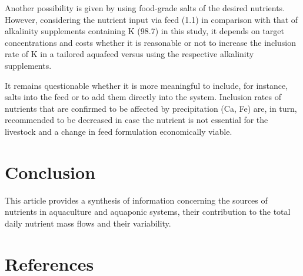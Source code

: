 \documentclass[preprint, 3p,
authoryear]{elsarticle} %
\begin{document}
Another possibility is given by using food-grade salts of the desired
nutrients. However, considering the nutrient input via feed
(\SI{1.1}{\p}) in comparison with that of alkalinity supplements
containing K (\SI{98.7}{\p}) in this study, it depends on target
concentrations and costs whether it is reasonable or not to increase the
inclusion rate of K in a tailored aquafeed versus using the respective
alkalinity supplements.

It remains questionable whether it is more meaningful to include, for
instance, salts into the feed or to add them directly into the system.
Inclusion rates of nutrients that are confirmed to be affected by
precipitation (Ca, Fe) are, in turn, recommended to be decreased in case
the nutrient is not essential for the livestock and a change in feed
formulation economically viable.

\hypertarget{conclusion}{%
\section{Conclusion}\label{conclusion}}

This article provides a synthesis of information concerning the sources
of nutrients in aquaculture and aquaponic systems, their contribution to
the total daily nutrient mass flows and their variability.

\hypertarget{references}{%
\section*{References}\label{references}}
\end{document}
